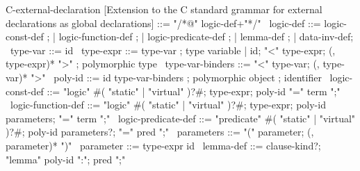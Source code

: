 \begin{syntax}
  C-external-declaration [Extension to the C  standard grammar for external declarations as global  declarations] ::= "/*@" logic-def+"*/"
  \
  logic-def ::= logic-const-def ;
          | logic-function-def ;
          | logic-predicate-def ;
          | lemma-def ;
          | data-inv-def;
  \
  type-var ::= id
  \
  type-expr ::= type-var ; type variable
  | id;
    "<" type-expr;
    (, type-expr)* ">" ; polymorphic type
  \
  type-var-binders ::= "<" type-var;
                       (, type-var)* ">"
  \
  poly-id ::= id type-var-binders ; polymorphic object
                                  ; identifier
  \
  logic-const-def ::= "logic" \ifCPPnc#( "static" | "virtual" )?#;
  type-expr;
  poly-id "=" term ";"
  \
  logic-function-def ::= "logic" \ifCPPnc#( "static" | "virtual" )?#;
  type-expr;
  poly-id parameters;
  "=" term ";"
  \
  logic-predicate-def ::=
  "predicate" \ifCPPnc#( "static" | "virtual" )?#;
  poly-id parameters?;
  "=" pred ";"
  \
  parameters ::= "(" parameter;
                 (, parameter)* ")"
  \
  parameter ::= type-expr id
  \
  lemma-def ::= clause-kind?;
                "lemma" poly-id ":";
                   pred ";"
\end{syntax}
